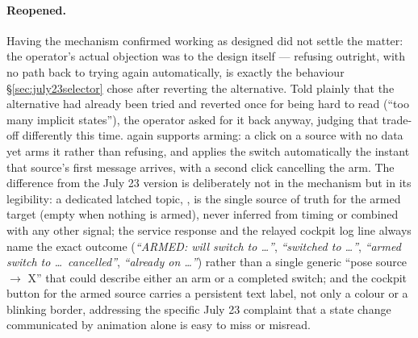 \paragraph{Reopened.} Having the mechanism confirmed working as designed did
not settle the matter: the operator's actual objection was to the design
itself — refusing outright, with no path back to trying again automatically,
is exactly the behaviour \S\ref{sec:july23selector} chose after reverting
the alternative. Told plainly that the alternative had already been tried
and reverted once for being hard to read (``too many implicit states''), the
operator asked for it back anyway, judging that trade-off differently this
time.  again supports arming: a click on a source with
no data yet arms it rather than refusing, and  applies
the switch automatically the instant that source's first message arrives,
with a second click cancelling the arm. The difference from the July 23
version is deliberately not in the mechanism but in its legibility: a
dedicated latched topic, ,
is the single source of truth for the armed target (empty when nothing is
armed), never inferred from timing or combined with any other signal; the
service response and the relayed cockpit log line always name the exact
outcome (\emph{``ARMED: will switch to \dots''}, \emph{``switched to
\dots''}, \emph{``armed switch to \dots\ cancelled''}, \emph{``already on
\dots''}) rather than a single generic ``pose source $\to$ X'' that could
describe either an arm or a completed switch; and the cockpit button for
the armed source carries a persistent text label, not only a colour or a
blinking border, addressing the specific July 23 complaint that a state
change communicated by animation alone is easy to miss or misread.

